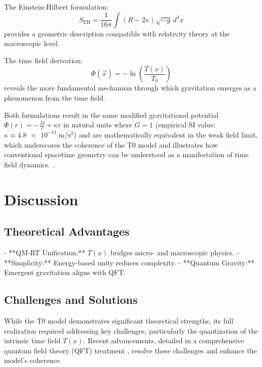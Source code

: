 \documentclass[12pt,a4paper]{article}
\newcommand{\Tfield}{T(x)}
\newcommand{\Tzero}{T_0}
\newcommand{\vecx}{\vec{x}}
\begin{document}
	The Einstein-Hilbert formulation:
	\begin{equation}
		S_{\text{EH}} = \frac{1}{16\pi} \int (R - 2\kappa) \sqrt{-g} \, d^4x
	\end{equation}
	provides a geometric description compatible with relativity theory at the macroscopic level.
	
	The time field derivation:
	\begin{equation}
		\Phi(\vecx) = -\ln\left(\frac{\Tfield}{\Tzero}\right)
	\end{equation}
	reveals the more fundamental mechanism through which gravitation emerges as a phenomenon from the time field.
	
	Both formulations result in the same modified gravitational potential \(\Phi(r) = -\frac{M}{r} + \kappa r\) in natural units where \(G = 1\) (empirical SI value: \(\kappa \approx \SI{4.8e-11}{\meter\per\second\squared}\)) and are mathematically equivalent in the weak field limit, which underscores the coherence of the T0 model and illustrates how conventional spacetime geometry can be understood as a manifestation of time field dynamics.
.
	\section{Discussion}
	\label{sec:discussion}
	
	\subsection{Theoretical Advantages}
	- **QM-RT Unification:** \(\Tfield\) bridges micro- and macroscopic physics.
	- **Simplicity:** Energy-based unity reduces complexity.
	- **Quantum Gravity:** Emergent gravitation aligns with QFT.
	
		\subsection{Challenges and Solutions}
	\label{subsec:challenges}
	
	While the T0 model demonstrates significant theoretical strengths, its full realization required addressing key challenges, particularly the quantization of the intrinsic time field \(\Tfield\). Recent advancements, detailed in a comprehensive quantum field theory (QFT) treatment \cite{pascher_qft_2025}, resolve these challenges and enhance the model’s coherence.
	
\end{document}
